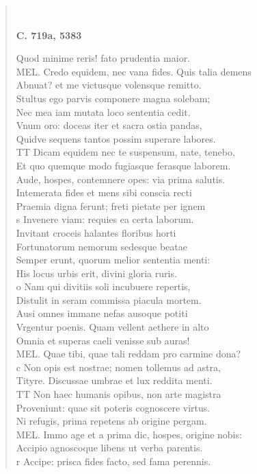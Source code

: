 \documentclass[11pt, a4paper]{report}
\begin{document}
\begin{verse}
        ﻿\pagebreak 
     \marginpar{[191]} \begin{center} \textbf{C. 719a, 5383} \end{center}Quod minime reris! fato prudentia maior. \\ MEL. Credo equidem, nec vana fides. Quis talia demens \\ Abnuat? et me victusque volensque remitto. \\ Stultus ego parvis componere magna solebam; \\ Nec mea iam mutata loco sententia cedit. \\ Vnum oro: doceas iter et sacra ostia pandas, \\ Quidve sequens tantos possim superare labores. \\  \lbrack TT Dicam equidem nec te suspensum, nate, tenebo, \\ Et quo quemque modo fugiasque ferasque laborem. \\ Aude, hospes, contemnere opes: via prima salutis. \\ Intemerata fides et mens sibi conscia recti \\ Praemia digna ferunt; freti pietate per ignem \\ s Invenere viam: requies ea certa laborum. \\ Invitant croceis halantes floribus horti \\ Fortunatorum nemorum sedesque beatae \\ Semper erunt, quorum melior sententia menti: \\ His locus urbis erit, divini gloria ruris. \\ o Nam qui divitiis soli incubuere repertis, \\ Distulit in seram commissa piacula mortem. \\ Ausi omnes immane nefas ausoque potiti \\ Vrgentur poenis. Quam vellent aethere in alto \\ Omnia et superas caeli venisse sub auras! \\ MEL. Quae tibi, quae tali reddam pro carmine dona? \\ c Non opis est nostrae; nomen tollemus ad astra, \\ Tityre. Discussae umbrae et lux reddita menti. \\  \lbrack TT Non haec humanis opibus, non arte magistra \\ Proveniunt: quae sit poteris cognoscere virtus. \\ Ni refugis, prima repetens ab origine pergam. \\ MEL. Immo age et a prima dic, hospes, origine nobis: \\ Accipio agnoscoque libens ut verba parentis. \\ r Accipe: prisca fides facto, sed fama perennis. \\ 

\end{verse}
\end{document}
